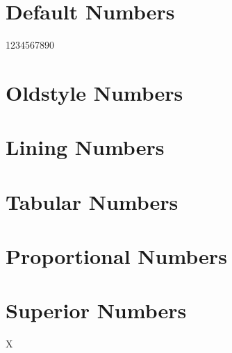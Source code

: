 \documentclass{article}
\begin{document}
\section*{Default Numbers}

1234567890

\section*{Oldstyle Numbers}

{}

\section*{Lining Numbers}

{}

\section*{Tabular Numbers}

{}

\section*{Proportional Numbers}

{}

\section*{Superior Numbers}

X{}
\end{document}
